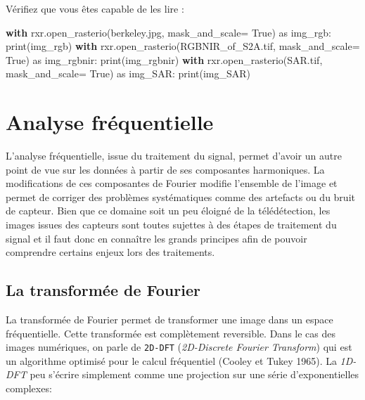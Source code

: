 \documentclass[
  11pt,
  letterpaper,
  open=any,
  twoside=false,
  french]{scrbook}
\newenvironment{Shaded}{\begin{snugshade}}{\end{snugshade}}
\newcommand{\BuiltInTok}[1]{\textcolor[rgb]{0.00,0.23,0.31}{#1}}
\newcommand{\ControlFlowTok}[1]{\textcolor[rgb]{0.00,0.23,0.31}{\textbf{#1}}}
\newcommand{\ImportTok}[1]{\textcolor[rgb]{0.00,0.46,0.62}{#1}}
\newcommand{\NormalTok}[1]{\textcolor[rgb]{0.00,0.23,0.31}{#1}}
\newcommand{\OperatorTok}[1]{\textcolor[rgb]{0.37,0.37,0.37}{#1}}
\newcommand{\StringTok}[1]{\textcolor[rgb]{0.13,0.47,0.30}{#1}}
\newcommand{\VariableTok}[1]{\textcolor[rgb]{0.07,0.07,0.07}{#1}}
\begin{document}
Vérifiez que vous êtes capable de les lire :

\begin{Shaded}
\begin{Highlighting}[]
\ControlFlowTok{with}\NormalTok{ rxr.open\_rasterio(}\StringTok{\textquotesingle{}berkeley.jpg\textquotesingle{}}\NormalTok{, mask\_and\_scale}\OperatorTok{=} \VariableTok{True}\NormalTok{) }\ImportTok{as}\NormalTok{ img\_rgb:}
    \BuiltInTok{print}\NormalTok{(img\_rgb)}
\ControlFlowTok{with}\NormalTok{ rxr.open\_rasterio(}\StringTok{\textquotesingle{}RGBNIR\_of\_S2A.tif\textquotesingle{}}\NormalTok{, mask\_and\_scale}\OperatorTok{=} \VariableTok{True}\NormalTok{) }\ImportTok{as}\NormalTok{ img\_rgbnir:}
    \BuiltInTok{print}\NormalTok{(img\_rgbnir)}
\ControlFlowTok{with}\NormalTok{ rxr.open\_rasterio(}\StringTok{\textquotesingle{}SAR.tif\textquotesingle{}}\NormalTok{, mask\_and\_scale}\OperatorTok{=} \VariableTok{True}\NormalTok{) }\ImportTok{as}\NormalTok{ img\_SAR:}
    \BuiltInTok{print}\NormalTok{(img\_SAR)}
\end{Highlighting}
\end{Shaded}

\section{Analyse fréquentielle}\label{analyse-fruxe9quentielle}

L'analyse fréquentielle, issue du traitement du signal, permet d'avoir
un autre point de vue sur les données à partir de ses composantes
harmoniques. La modifications de ces composantes de Fourier modifie
l'ensemble de l'image et permet de corriger des problèmes systématiques
comme des artefacts ou du bruit de capteur. Bien que ce domaine soit un
peu éloigné de la télédétection, les images issues des capteurs sont
toutes sujettes à des étapes de traitement du signal et il faut donc en
connaître les grands principes afin de pouvoir comprendre certains
enjeux lors des traitements.

\subsection{La transformée de
Fourier}\label{la-transformuxe9e-de-fourier}

La transformée de Fourier permet de transformer une image dans un espace
fréquentielle. Cette transformée est complètement reversible. Dans le
cas des images numériques, on parle de \texttt{2D-DFT}
(\emph{2D-Discrete Fourier Transform}) qui est un algorithme optimisé
pour le calcul fréquentiel (Cooley et Tukey 1965). La \emph{1D-DFT} peu
s'écrire simplement comme une projection sur une série d'exponentielles
complexes:
\end{document}
